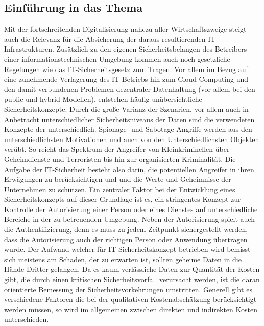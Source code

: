\documentclass[
a4paper,   
titlepage,  
halfparskip,
12pt        
]{scrartcl}
\begin{document}
\begin{onehalfspacing}
\subsection{Einführung in das Thema}
\label{subsec:einfuehrung}
Mit der fortschreitenden Digitalisierung nahezu aller Wirtschaftszweige steigt auch die Relevanz für die Absicherung der daraus resultierenden \ac{IT}-Infrastrukturen.
Zusätzlich zu den eigenen Sicherheitsbelangen des Betreibers einer informationstechnischen Umgebung kommen auch noch gesetzliche Regelungen wie das IT-Sicherheitsgesetz zum Tragen. 
Vor allem im Bezug auf eine zunehmende Verlagerung des \ac{IT}-Betriebs hin zum Cloud-Computing und den damit verbundenen Problemen dezentraler Datenhaltung (vor allem bei den public und hybrid Modellen), entstehen häufig unübersichtliche Sicherheitskonzepte. Durch die große Varianz der Szenarien, vor allem auch in Anbetracht unterschiedlicher Sicherheitsniveaus der Daten sind die verwendeten Konzepte der unterschiedlich.\cite[S. 7f]{risiko}\newline
Spionage- und Sabotage-Angriffe werden aus den unterschiedlichsten Motivationen und auch von den Unterschiedlichsten Objekten verübt. So reicht das Spektrum der Angreifer von Kleinkriminellen über Geheimdienste und Terroristen bis hin zur organisierten Kriminalität. Die Aufgabe der \ac{IT}-Sicherheit besteht also darin, die potentiellen Angreifer in ihren Erwägungen zu berücksichtigen und und die Werte und Geheimnisse der Unternehmen zu schützen. Ein zentraler Faktor bei der Entwicklung eines Sicherheitskonzepts auf dieser Grundlage ist es, ein stringentes Konzept zur Kontrolle der Autorisierung einer Person oder eines Dienstes auf unterschiedliche Bereiche in der zu betreuenden Umgebung. Neben der Autorisierung spielt auch die Authentifizierung, denn es muss zu jedem Zeitpunkt sichergestellt werden, dass die Autorisierung auch der richtigen Person oder Anwendung übertragen wurde.\cite[S. 9]{risiko} 
Der Aufwand welcher für \ac{IT}-Sicherheitskonzept betrieben wird bemisst sich meistens am Schaden, der zu erwarten ist, sollten geheime Daten in die Hände Dritter gelangen. Da es kaum verlässliche Daten zur Quantität der Kosten gibt, die durch einen kritischen Sicherheitsvorfall verursacht werden, ist die daran orientierte Bemessung der Sicherheitsvorkehrungen umstritten. Generell gibt es verschiedene Faktoren die bei der qualitativen Kostenabschätzung berücksichtigt werden müssen, so wird im allgemeinen zwischen direkten und indirekten Kosten unterschieden.\cite[S. 12]{kosten}

\end{onehalfspacing}
\end{document}
